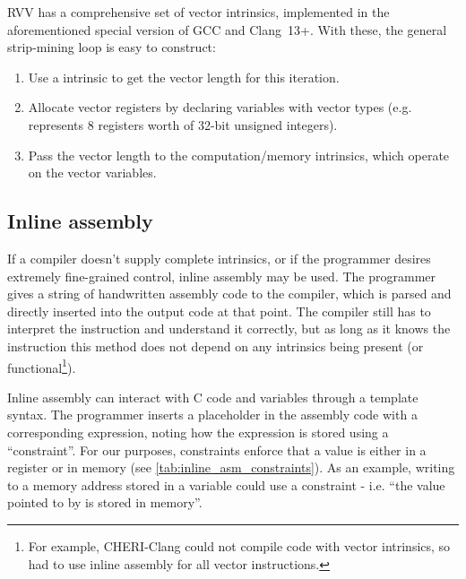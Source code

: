 \documentclass[../thesis]{subfiles}
\begin{document}
RVV has a comprehensive set of vector intrinsics\cite{specification-RVV-intrinsics}, implemented in the aforementioned special version of GCC and Clang~13+.
With these, the general strip-mining loop is easy to construct:
\begin{enumerate}
    \item Use a  intrinsic to get the vector length for this iteration.
    \item Allocate vector registers by declaring variables with vector types (e.g.  represents 8 registers worth of 32-bit unsigned integers).
    \item Pass the vector length to the computation/memory intrinsics, which operate on the vector variables.
\end{enumerate}


\subsection{Inline assembly}
If a compiler doesn't supply complete intrinsics, or if the programmer desires extremely fine-grained control, inline assembly may be used.
The programmer gives a string of handwritten assembly code to the compiler, which is parsed and directly inserted into the output code at that point.
The compiler still has to interpret the instruction and understand it correctly, but as long as it knows the instruction this method does not depend on any intrinsics being present (or functional\footnote{For example, CHERI-Clang could not compile code with vector intrinsics, so had to use inline assembly for all vector instructions.}).

Inline assembly can interact with C code and variables through a template syntax.
The programmer inserts a placeholder in the assembly code with a corresponding expression, noting how the expression is stored using a \enquote{constraint}.
For our purposes, constraints enforce that a value is either in a register or in memory (see \cref{tab:inline_asm_constraints}).
As an example, writing to a memory address stored in a variable could use a constraint  - i.e. \enquote{the value pointed to by  is stored in memory}.  
\end{document}
